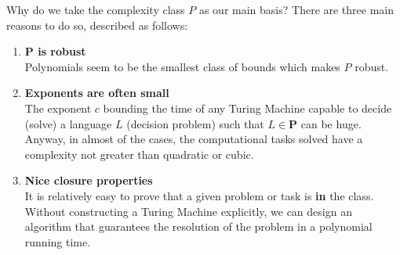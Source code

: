 Why do we take the complexity class $P$ as our main basis? There are three main reasons to do so, described as follows:
\begin{enumerate}
    \item \textbf{P is robust} \\ Polynomials seem to be the smallest class of bounds which makes $P$ robust.
    \item \textbf{Exponents are often small} \\ The exponent $c$ bounding the time of any Turing Machine capable to decide (solve) a language $L$ (decision problem) such that $L \in \textbf{P}$ can be huge. Anyway, in almost of the cases, the computational tasks solved have a complexity not greater than quadratic or cubic.
    \item \textbf{Nice closure properties} \\ It is relatively easy to prove that a given problem or task is \textbf{in} the class. Without constructing a Turing Machine explicitly, we can design an algorithm that guarantees the resolution of the problem in a polynomial running time.
\end{enumerate} 